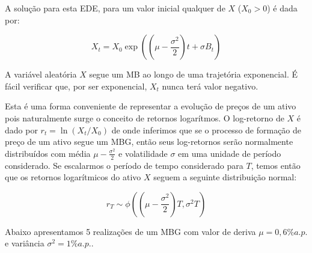 \documentclass[]{book}
\theoremstyle{definition}
\theoremstyle{definition}
\theoremstyle{definition}
\theoremstyle{remark}
\begin{document}
A solução para esta EDE, para um valor inicial qualquer de \(X\) (\(X_0 > 0\)) é dada por:

\begin{equation}
X_t = X_0\exp\left(\left(\mu-\frac{\sigma^2}{2}\right)t+\sigma B_t\right)
\label{eq:mbgsol}
\end{equation}

A variável aleatória \(X\) segue um MB ao longo de uma trajetória exponencial. É fácil verificar que, por ser exponencial, \(X_t\) nunca terá valor negativo.

Esta é uma forma conveniente de representar a evolução de preços de um ativo pois naturalmente surge o conceito de retornos logarítmos. O log-retorno de \(X\) é dado por \(r_t=\ln(X_t/X_0)\) de onde inferimos que se o processo de formação de preço de um ativo segue um MBG, então seus log-retornos serão normalmente distribuídos com média \(\mu-\frac{\sigma^2}{2}\) e volatilidade \(\sigma\) em uma unidade de período considerado. Se escalarmos o período de tempo considerado para \(T\), temos então que os retornos logarítmicos do ativo \(X\) seguem a seguinte distribuição normal:

\begin{equation}
r_T \sim\phi\left(\left(\mu-\frac{\sigma^2}{2}\right)T, \sigma^2T\right)
\label{eq:rT}
\end{equation}

Abaixo apresentamos 5 realizações de um MBG com valor de deriva \(\mu = 0,6\% a.p.\) e variância \(\sigma^2=1\% a.p.\).
\end{document}
